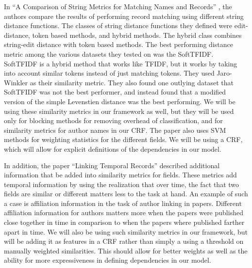 \documentclass[]{article}
\begin{document}
In ``A Comparison of String Metrics for Matching Names and Records'' \cite{cohen2003comparison}, the authors compare the results of performing record matching using different string distance functions. The classes of string distance functions they defined were edit-distance, token based methods, and hybrid methods. The hybrid class combines string-edit distance with token based methods. The best performing distance metric among the various datasets they tested on was the SoftTFIDF. SoftTFIDF is a hybrid method that works like TFIDF, but it works by taking into account similar tokens instead of just matching tokens. They used Jaro-Winkler as their similarity metric. They also found one outlying dataset that SoftTFIDF was not the best performer, and instead found that a modified version of the simple Levenstien distance was the best performing. We will be using these similarity metrics in our framework as well, but they will be used only for blocking methods for removing overhead of classification, and for similarity metrics for author names in our CRF. The paper also uses SVM methods for weighting statistics for the different fields. We will be using a CRF, which will allow for explicit definitions of the dependencies in our model.

In addition, the paper ``Linking Temporal Records'' \cite{DBLP:journals/fcsc/LiDMS12} described additional information that be added into similarity metrics for fields. These metrics add temporal information by using the realization that over time, the fact that two fields are similar or different matters less to the task at hand. An example of such a case is affiliation information in the task of author linking in papers. Different affiliation information for authors matters more when the papers were published close together in time in comparison to when the papers where published farther apart in time. We will also be using such similarity metrics in our framework, but will be adding it as features in a CRF rather than simply a using a threshold on manually weighted similarities. This should allow for better weights as well as the ability for more expressiveness in defining dependencies in our model.
\end{document}
